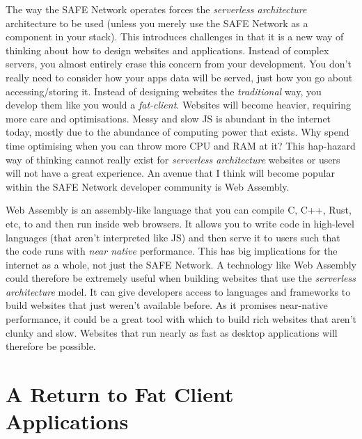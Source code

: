 \documentclass{l4proj}
\begin{document}
The way the SAFE Network operates forces the \textit{serverless architecture} architecture to be used (unless you merely use the SAFE Network as a component in your stack). This introduces challenges in that it is a new way of thinking about how to design websites and applications. Instead of complex servers, you almost entirely erase this concern from your development. You don't really need to consider how your apps data will be served, just how you go about accessing/storing it. Instead of designing websites the \textit{traditional} way, you develop them like you would a \textit{fat-client}. Websites will become heavier, requiring more care and optimisations. Messy and slow JS is abundant in the internet today, mostly due to the abundance of computing power that exists. Why spend time optimising when you can throw more CPU and RAM at it? This hap-hazard way of thinking cannot really exist for \textit{serverless architecture} websites or users will not have a great experience. An avenue that I think will become popular within the SAFE Network developer community is Web Assembly. 

Web Assembly is an assembly-like language that you can compile C, C++, Rust, etc, to and then run inside web browsers. It allows you to write code in high-level languages (that aren't interpreted like JS) and then serve it to users such that the code runs with \textit{near native} performance. This has big implications for the internet as a whole, not just the SAFE Network. A technology like Web Assembly could therefore be extremely useful when building websites that use the \textit{serverless architecture} model. It can give developers access to languages and frameworks to build websites that just weren't available before. As it promises near-native performance, it could be a great tool with which to build rich websites that aren't clunky and slow. Websites that run nearly as fast as desktop applications will therefore be possible.

\section{A Return to Fat Client Applications}
\end{document}
